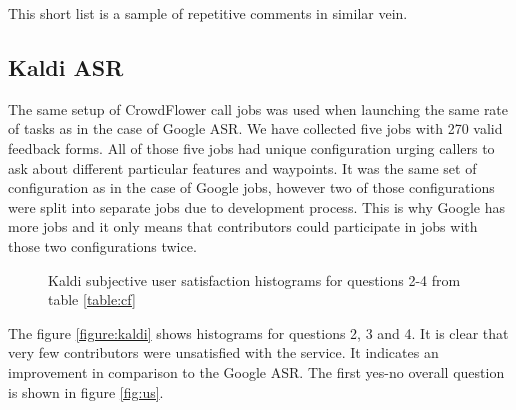 \noindent This short list is a sample of repetitive comments in similar vein.

\subsection{Kaldi ASR}

The same setup of CrowdFlower call jobs was used when launching the same rate of tasks as in the case of Google ASR.
We have collected five jobs with 270 valid feedback forms.
All of those five jobs had unique configuration urging callers to ask about different particular features and waypoints.
It was the same set of configuration as in the case of Google jobs, however two of those configurations were split into separate jobs due to development process.
This is why Google has more jobs and it only means that contributors could participate in jobs with those two configurations twice.

\begin{figure}[ht]
\caption{Kaldi subjective user satisfaction histograms for questions 2-4 from table \ref{table:cf}}
\label{fig:kaldi}
\end{figure}


The figure \ref{figure:kaldi} shows histograms for questions 2, 3 and 4.
It is clear that very few contributors were unsatisfied with the service.
It indicates an improvement in comparison to the Google ASR.
The first yes-no overall question is shown in figure \ref{fig:us}.

